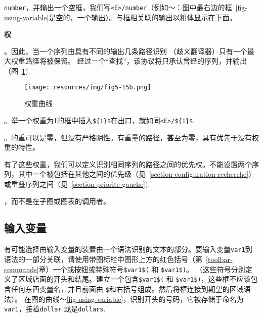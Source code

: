 \bigskip
{}\verb+number+，并输出一个空框，我们写\verb+<E>/number+（例如〜：图中最右边的框~\ref{fig-using-variable}是空的，一个输出）。与框相关联的输出以粗体显示在下面。

\bigskip
\noindent \textbf{权}

。因此，当一个序列由具有不同的输出几条路径识别
（歧义翻译器）只有一个最大权重路径将被保留。
经过一个“查找”，该协议将只承认曾经的序列，并输出（图~\ref{fig-weights-in-graphs}).

\begin{figure}[h!]
\begin{center}
\texttt{[image: resources/img/fig5-15b.png]}
\caption{权重曲线\label{fig-weights-in-graphs}}
\end{center}
\end{figure}

\bigskip
{}。举一个权重为1的框中插入\verb+${1}$+在出口，就如同\verb+<E>/${1}$+.

\bigskip
{}。的重可以是零，但没有严格阴性。有重量的路径，甚至为零，具有优先于没有权重的特性。

\bigskip
\noindent 有了这些权重，我们可以定义识别相同序列的路径之间的优先权。不能设置两个序列，其中一个被包括在其他之间的优先级（见~\ref{section-configuration-recherche}）或重叠序列之间（见~\ref{section-priorite-gauche}).

\bigskip
{}，而不是在子图或图表的调用者。


\subsection{输入变量}
\label{section-using-variables}
\index{\verb+$+$}

有可能选择由输入变量的装置由一个语法识别的文本的部分。要输入变量\verb+var1+到语法的一部分关联，请使用带图标栏中图形上方的红色括号（第~\ref{toolbar-commands}章）一个或按钮或特殊符号\verb+$var1$(+ 和
\verb+$var1$)+。 （这些符号分别定义了区域店面的开头和结尾。建立一个包含\verb+$var1$(+ 和 \verb+$var1$)+，这些框不应该包含任何东西变量名，并且前面由 \verb+$+和右括号组成。然后将框连接到期望的区域语法）。 
在图的曲线〜\ref{fig-using-variable}，识别开头的号码，它被存储于命名为\verb+var1+，接着\verb+dollar+ 或是\verb+dollars+.

